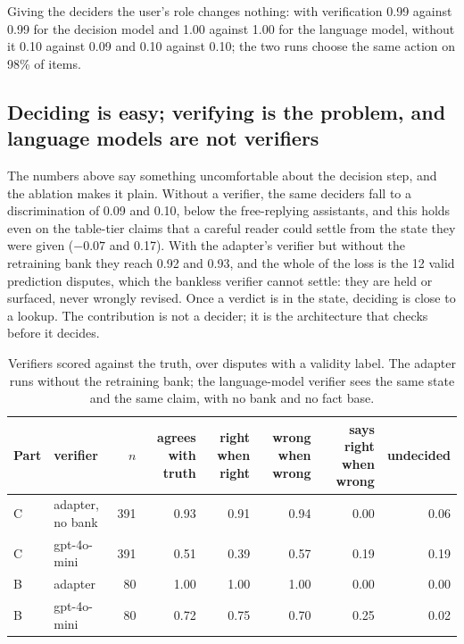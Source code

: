 \documentclass[preprint,12pt,3p,times]{elsarticle}
\begin{document}
Giving the deciders the user's role changes nothing: with verification 0.99 against 0.99 for the decision model and 1.00 against 1.00 for the language model, without it 0.10 against 0.09 and 0.10 against 0.10; the two runs choose the same action on 98\% of items.

\subsection{Deciding is easy; verifying is the problem, and language models are not verifiers}
\label{sec:res-verify}

The numbers above say something uncomfortable about the decision step, and the ablation makes it plain. Without a verifier, the same deciders fall to a discrimination of 0.09 and 0.10, below the free-replying assistants, and this holds even on the table-tier claims that a careful reader could settle from the state they were given ($-0.07$ and 0.17). With the adapter's verifier but without the retraining bank they reach 0.92 and 0.93, and the whole of the loss is the 12 valid prediction disputes, which the bankless verifier cannot settle: they are held or surfaced, never wrongly revised. Once a verdict is in the state, deciding is close to a lookup. The contribution is not a decider; it is the architecture that checks before it decides.

\begin{table}[t]
\centering
\caption{Verifiers scored against the truth, over disputes with a validity label. The adapter runs without the retraining bank; the language-model verifier sees the same state and the same claim, with no bank and no fact base.}
\label{tab:verifiers}
\small
\begin{tabular}{llrrrrrr}
\toprule
Part & verifier & $n$ & agrees with truth & right when right & wrong when wrong & says right when wrong & undecided \\
\midrule
C & adapter, no bank & 391 & 0.93 & 0.91 & 0.94 & 0.00 & 0.06 \\
C & gpt-4o-mini & 391 & 0.51 & 0.39 & 0.57 & 0.19 & 0.19 \\
B & adapter & 80 & 1.00 & 1.00 & 1.00 & 0.00 & 0.00 \\
B & gpt-4o-mini & 80 & 0.72 & 0.75 & 0.70 & 0.25 & 0.02 \\
\bottomrule
\end{tabular}
\end{table}
\end{document}
